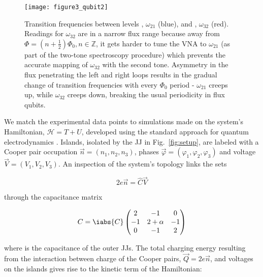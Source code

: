 
\begin{figure}[h]
  \texttt{[image: figure3\_qubit2]}
  \caption{\small    Transition   frequencies    between   levels    \ilra   {},
    $  \omega_{21}  $  (blue),  and    \ilra  {},  $  \omega_{32}$  (red).   Readings  for
    $    \omega_{32}    $     are    in    a    narrow    flux    range     because    away    from
    $  \Phi  =  (n +  \frac{1}{2})\Phi_0,  n\in\mathbb{Z}  $,  it  gets  harder  to tune  the  VNA  to
    $ \omega_{21} $  (as part of the  two-tone spectroscopy procedure) which  prevents the accurate
    mapping of $  \omega_{32} $ with the second  tone.  Asymmetry in the flux  penetrating the left
    and  right loops  results  in the  gradual  change of  transition  frequencies with  every
    $ \Phi_{0}  $ period -  $\omega_{21}$ creeps  up, while $\omega_{32}$  creeps down, breaking  the usual
    periodicity in flux qubits.}
  \label{fig:experiment}
\end{figure}

We  match the  experimental  data points  to  simulations made  on  the system's  Hamiltonian,
$ \mathcal{H}  = T + U  $, developed using  the standard approach for  quantum electrodynamics
\cite{orlando1999}. Islands,  isolated by the JJ  in Fig.~\ref{fig:setup}, are labeled  with a
Cooper    pair     occupation    $     \vec{n}    =    (n_1,     n_2,    n_3)     $,    phases
$        \vec{\varphi}       =        (\varphi_1,        \varphi_2,       \varphi_3)        $       and        voltage
$ \vec{V} = \left(V_{1}, V_{2}, V_{3}\right) $.   An inspection of the system's topology links
the sets

\begin{equation}
  \label{eq:link}
  2e\vec{n} = \hat{C}\vec{V}
\end{equation}

\noindent through the capacitance matrix

\begin{equation}
  \label{eq:capac}
  C = \iabs{C} \begin{pmatrix}
    2  &  -1  &  0\\
    -1  &  2  +  \alpha  &  -1\\
    0  &  -1  & 2
  \end{pmatrix}
\end{equation}

\noindent  where   is the  capacitance of  the outer  JJs. The  total charging  energy
resulting from the interaction between charge of  the Cooper pairs, $ \vec{Q}=2e\vec{n} $, and
voltages on the islands gives rise to the kinetic term of the Hamiltonian:

